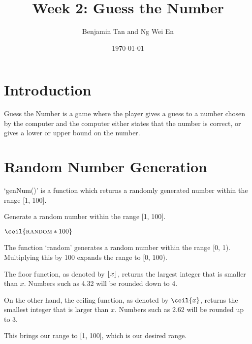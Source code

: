 \documentclass{article}
\title{Week 2: Guess the Number}
\author{Benjamin Tan and Ng Wei En}
\date{\today}
\DeclarePairedDelimiter{\floor}{\lfloor}{\rfloor}
\begin{document}
\maketitle

\section{Introduction}

Guess the Number is a game where the player gives a guess to a number chosen by the computer and the computer either states that the number is correct, or gives a lower or upper bound on the number.

\section{Random Number Generation}

`genNum()' is a function which returns a randomly generated number within the range [1, 100].

\begin{algorithm}
\caption{Generate a random number within the range [1, 100].}

\begin{algorithmic}[1]
  \Return $\ceil{\Call{random}{} * 100}$
\EndProcedure
\end{algorithmic}
\end{algorithm}

The function `random' generates a random number within the range [0, 1). Multiplying this by 100 expands the range to [0, 100).

The floor function, as denoted by $\floor{x}$, returns the largest integer that is smaller than $x$. Numbers such as 4.32 will be rounded down to 4.

On the other hand, the ceiling function, as denoted by $\ceil{x}$, returns the smallest integer that is larger than $x$. Numbers such as 2.62 will be rounded up to 3.

This brings our range to [1, 100], which is our desired range.
\end{document}
